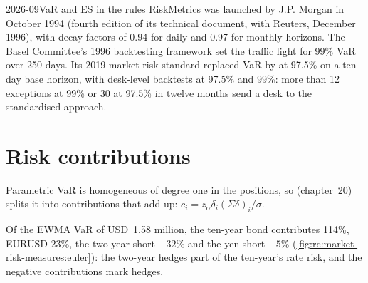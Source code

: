 \begin{dated}{2026-09}{VaR and ES in the rules}\label{dat:rc:market-risk-measures:basel}
RiskMetrics was launched by J.P. Morgan in October 1994 (fourth edition of its technical
document, with Reuters, December 1996), with decay factors of 0.94 for daily and 0.97 for
monthly horizons. The Basel Committee's 1996 backtesting framework set the traffic light for
99\% VaR over 250 days. Its 2019 market-risk standard replaced VaR by  at
97.5\% on a ten-day base horizon, with desk-level backtests at 97.5\% and 99\%: more than 12
exceptions at 99\% or 30 at 97.5\% in twelve months send a desk to the standardised approach.
\end{dated}

\section{Risk contributions}

Parametric VaR is homogeneous of degree one in the positions, so 
(chapter~20) splits it into contributions that add up: $c_i = z_\alpha\delta_i(\Sigma\delta)_i/\sigma$.

\begin{example}\label{ex:rc:market-risk-measures:euler}
Of the EWMA VaR of USD~1.58 million, the ten-year bond contributes 114\%, EURUSD 23\%, the
two-year short $-32\%$ and the yen short $-5\%$ (\cref{fig:rc:market-risk-measures:euler}): the
two-year hedges part of the ten-year's rate risk, and the negative contributions mark hedges.
\end{example}

\begin{omfigure}

\label{fig:rc:market-risk-measures:euler}
\end{omfigure}

